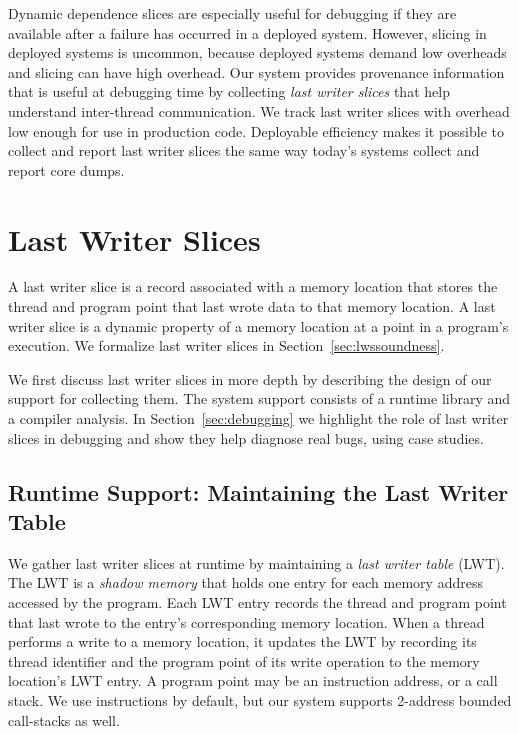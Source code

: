 \documentclass[preprint,9pt]{sigplanconf}
\newcommand{\lwt}{LWT\xspace}
\begin{document}
Dynamic dependence slices are especially useful for debugging if they are
available after a failure has occurred in a deployed system. However, slicing
in deployed systems is uncommon, because deployed systems demand low overheads
and slicing can have high overhead.  Our system provides provenance information
that is useful at debugging time by collecting {\em last writer slices} that
help understand inter-thread communication.  We track last writer slices
with overhead low enough for use in production code.  Deployable efficiency
makes it possible to collect and report last writer slices the same way today's
systems collect and report core dumps.

\section{Last Writer Slices}
\label{sec:lastwriterslices}

A last writer slice is a record associated with a memory location that stores
the thread and program point that last wrote data to that memory location.  A
last writer slice is a dynamic property of a memory location at a point in a
program's execution.   We formalize last writer slices in
Section~\ref{sec:lwssoundness}. 

We first discuss last writer slices in more depth by describing the design of
our support for collecting them.  The system support consists of a runtime
library and a compiler analysis.  In Section~\ref{sec:debugging} we highlight
the role of last writer slices in debugging and show they help diagnose real
bugs, using case studies.

\subsection{Runtime Support: Maintaining the Last Writer Table}
We gather last writer slices at runtime by maintaining a {\em last writer
table} (\lwt).  The \lwt is a {\em shadow memory} that holds one entry for each
memory address accessed by the program.  Each \lwt entry records the thread and
program point that last wrote to the entry's corresponding memory location.
When a thread performs a write to a memory location, it updates the \lwt by
recording its thread identifier and the program point of its write operation to
the memory location's \lwt entry.  A program point may be an
instruction address, or a call stack.  We use instructions by default, but our
system supports 2-address bounded call-stacks as well.   
\end{document}
